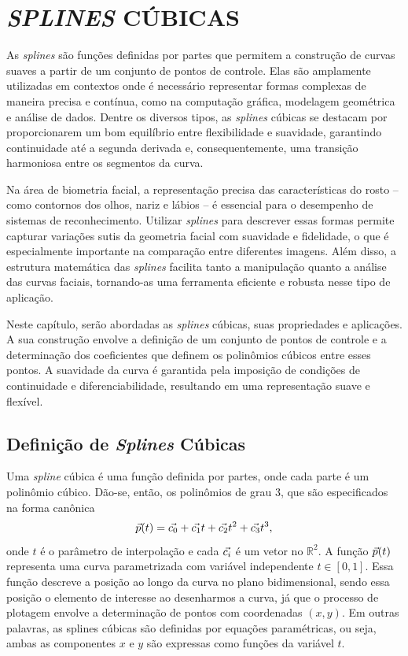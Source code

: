 \chapter{\textit{SPLINES} CÚBICAS} \label{cha:splines}

As \textit{splines} são funções definidas por partes que permitem a construção de curvas suaves a partir de um conjunto de pontos de controle. Elas são amplamente utilizadas em contextos onde é necessário representar formas complexas de maneira precisa e contínua, como na computação gráfica, modelagem geométrica e análise de dados. Dentre os diversos tipos, as \textit{splines} cúbicas se destacam por proporcionarem um bom equilíbrio entre flexibilidade e suavidade, garantindo continuidade até a segunda derivada e, consequentemente, uma transição harmoniosa entre os segmentos da curva.

Na área de biometria facial, a representação precisa das características do rosto -- como contornos dos olhos, nariz e lábios -- é essencial para o desempenho de sistemas de reconhecimento. Utilizar \textit{splines} para descrever essas formas permite capturar variações sutis da geometria facial com suavidade e fidelidade, o que é especialmente importante na comparação entre diferentes imagens. Além disso, a estrutura matemática das \textit{splines} facilita tanto a manipulação quanto a análise das curvas faciais, tornando-as uma ferramenta eficiente e robusta nesse tipo de aplicação.

Neste capítulo, serão abordadas as \textit{splines} cúbicas, suas propriedades e aplicações. A sua construção envolve a definição de um conjunto de pontos de controle e a determinação dos coeficientes que definem os polinômios cúbicos entre esses pontos. A suavidade da curva é garantida pela imposição de condições de continuidade e diferenciabilidade, resultando em uma representação suave e flexível.

\section{Definição de \textit{Splines} Cúbicas}
\label{sec:definicao-splines-cubicas}
Uma \textit{spline} cúbica é uma função definida por partes, onde cada parte é um polinômio cúbico. Dão-se, então, os polinômios de grau 3, que são especificados na forma canônica
\begin{equation}
    {\vec{p}}(t) = {\vec{c_0}} + {\vec{c_1}}t + {\vec{c_2}}t^2 + {\vec{c_3}}t^3,
\end{equation}
onde $t$ é o parâmetro de interpolação e cada ${\vec{c_i}}$ é um vetor no $\mathbb{R}^2$. A função ${\vec{p}}(t)$ representa uma curva parametrizada com variável independente \( t \in [0,1] \). Essa função descreve a posição ao longo da curva no plano bidimensional, sendo essa posição o elemento de interesse ao desenharmos a curva, já que o processo de plotagem envolve a determinação de pontos com coordenadas $(x, y)$. Em outras palavras, as splines cúbicas são definidas por equações paramétricas, ou seja, ambas as componentes $x$ e $y$ são expressas como funções da variável $t$.

